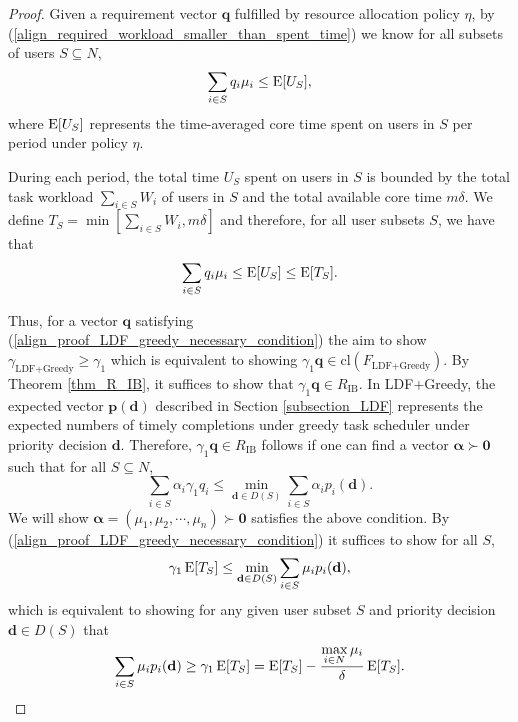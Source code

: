\documentclass[prodmode,acmtompecs]{acmsmall}
\newcommand{\reqvec}{\mathbf{q}}
\newcommand{\reqscalar}{q}
\newcommand{\ribvec}{\boldsymbol{\alpha}}
\newcommand{\ribscalar}{\alpha}
\newcommand{\feasibilityRegion}{F}
\newcommand{\fullUserSet}{N}
\newcommand{\myComments}[1]{}
\newif\iftompecs
\newcommand{\tompecsStart}{\iftompecs \myComments{TOMPECS version: }}
\begin{document}
\tompecsStart
\begin{proof}
Given a requirement vector $\reqvec$ fulfilled by resource allocation policy $\eta$, by (\ref{align_required_workload_smaller_than_spent_time}) we know for all subsets of users $S \subseteq \fullUserSet$, 
$$
\sum\limits_{i\in S}\reqscalar_i \mu_i \leq \expectation[U_S], 
$$
where $\operatorname*{\mathrm{E}}[U_S]$ represents the time-averaged core time spent on users in $S$ per period under policy $\eta$. 

During each period, the total time $U_S$ spent on users in $S$ is bounded by the total task workload $\sum\limits_{i \in S} W_i$ of users in $S$ and the total available core time $m\delta$. 
We define $T_S = \min\left[\sum\limits_{i \in S} W_i, m\delta \right]$ and therefore, for all user subsets $S$, we have that
\begin{align}
\label{align_proof_LDF_greedy_necessary_condition}
\sum\limits_{i\in S}\reqscalar_i \mu_i \leq \expectation[U_S] \leq \expectation[T_S]. 
\end{align}

Thus, for a vector $\reqvec$ satisfying (\ref{align_proof_LDF_greedy_necessary_condition}) the aim to show $\gamma_\text{LDF+Greedy} \geq \gamma_1$ which is equivalent to showing $\gamma_1 \reqvec \in \text{cl}(\feasibilityRegion_\text{LDF+Greedy})$. By Theorem \ref{thm_R_IB}, it suffices to show that $\gamma_1 \reqvec \in R_{\text{IB}}$.
In LDF+Greedy, the expected vector $\mathbf{p}(\mathbf{d})$ described in Section \ref{subsection_LDF} represents the expected numbers of timely completions under greedy task scheduler under priority decision $\mathbf{d}$.  
Therefore, $\gamma_1 \reqvec \in R_{\text{IB}}$ follows if one can find a vector $\ribvec \succ \mathbf{0}$ such that for all $S \subseteq \fullUserSet$, 
$$
\sum\limits_{i\in S} \ribscalar_i \gamma_1 {\reqscalar}_i \leq \min\limits_{\mathbf{d} \in D(S)} \sum\limits_{i\in S} {\ribscalar}_i p_i(\mathbf{d}). 
$$
We will show $\ribvec = (\mu_1, \mu_2, \cdots, \mu_n) \succ \mathbf{0}$ satisfies the above condition. By (\ref{align_proof_LDF_greedy_necessary_condition}) it suffices to show for all $S$,
\begin{align*}
\gamma_1 \operatorname*{\mathrm{E}}[T_S] \leq \min\limits_{\mathbf{d} \in D(S)} \sum\limits_{i\in S} \mu_i p_i(\mathbf{d}), 
\end{align*}
which is equivalent to showing for any given user subset $S$ and priority decision $\mathbf{d} \in D(S)$ that
\begin{align}
\label{align_gamma_exp_T_S_leq}
\sum\limits_{i\in S} \mu_i p_i(\mathbf{d}) \geq \gamma_1 \expectation[T_S] = \expectation[T_S] - \frac{\max\limits_{i \in \fullUserSet} \mu_i}{\delta} \expectation[T_S].
\end{align}


\end{proof}
\end{document}
